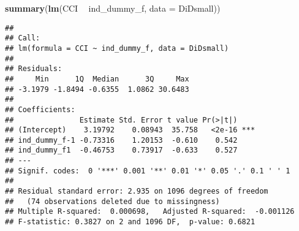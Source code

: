 \documentclass[]{article}
\newenvironment{Shaded}{\begin{snugshade}}{\end{snugshade}}
\newcommand{\KeywordTok}[1]{\textcolor[rgb]{0.13,0.29,0.53}{\textbf{#1}}}
\newcommand{\DataTypeTok}[1]{\textcolor[rgb]{0.13,0.29,0.53}{#1}}
\newcommand{\StringTok}[1]{\textcolor[rgb]{0.31,0.60,0.02}{#1}}
\newcommand{\CommentTok}[1]{\textcolor[rgb]{0.56,0.35,0.01}{\textit{#1}}}
\newcommand{\OperatorTok}[1]{\textcolor[rgb]{0.81,0.36,0.00}{\textbf{#1}}}
\newcommand{\NormalTok}[1]{#1}
\begin{document}
\begin{Shaded}
\end{Shaded}

\begin{Shaded}
\begin{Highlighting}[]
\KeywordTok{summary}\NormalTok{(}\KeywordTok{lm}\NormalTok{(CCI }\OperatorTok{~}\StringTok{ }\NormalTok{ind_dummy_f, }\DataTypeTok{data =}\NormalTok{ DiDsmall))}
\end{Highlighting}
\end{Shaded}

\begin{verbatim}
## 
## Call:
## lm(formula = CCI ~ ind_dummy_f, data = DiDsmall)
## 
## Residuals:
##     Min      1Q  Median      3Q     Max 
## -3.1979 -1.8494 -0.6355  1.0862 30.6483 
## 
## Coefficients:
##               Estimate Std. Error t value Pr(>|t|)    
## (Intercept)    3.19792    0.08943  35.758   <2e-16 ***
## ind_dummy_f-1 -0.73316    1.20153  -0.610    0.542    
## ind_dummy_f1  -0.46753    0.73917  -0.633    0.527    
## ---
## Signif. codes:  0 '***' 0.001 '**' 0.01 '*' 0.05 '.' 0.1 ' ' 1
## 
## Residual standard error: 2.935 on 1096 degrees of freedom
##   (74 observations deleted due to missingness)
## Multiple R-squared:  0.000698,   Adjusted R-squared:  -0.001126 
## F-statistic: 0.3827 on 2 and 1096 DF,  p-value: 0.6821
\end{verbatim}
\end{document}
